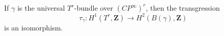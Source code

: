 If $\gamma$ is the universal $T^r$-bundle over $(CP^\infty)^r$, then the transgression
\[
\tau_\gamma \colon H^1(T^r, \mathbf{Z}) \to H^2(B(\gamma), \mathbf{Z})
\]
is an isomorphism.

